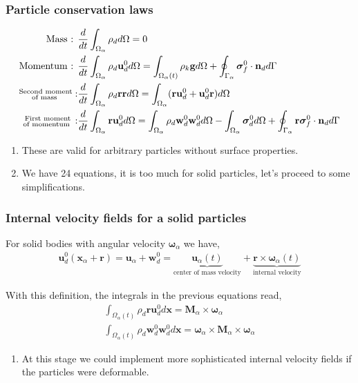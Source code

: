 \documentclass{sintefbeamer}
\begin{document}
\begin{frame}
  \frametitle{Particle conservation laws }
\begin{align*} 
  \text{Mass :   }
  &
  \frac{d}{dt} \int_{\Omega_{\alpha}} \rho_d d\Omega
  = 
  0\\
  \text{Momentum :   }
  &
  \frac{d}{dt} \int_{\Omega_{\alpha}} \rho_d \textbf{u}_d^0 d\Omega
  = 
  \int_{\Omega_\alpha(t)} \rho_k \textbf{g} d\Omega  
  + \oint_{\Gamma_{\alpha}} \bm{\sigma}_f^0 \cdot \textbf{n}_d d\Gamma
  \\
  \substack{\text{Second moment} \\ \text{of mass }} : 
  &
  \frac{d}{dt} \int_{\Omega_{\alpha}} \rho_d \textbf{rr} d\Omega
  = \int_{\Omega_{\alpha}} (\textbf{r} \textbf{u}_d^0+\textbf{u}_d^0\textbf{r} ) d\Omega\\
  \substack{\text{First moment} \\ \text{of momentum }} : 
  &
  \frac{d}{dt} \int_{\Omega_{\alpha}} \textbf{ru}_d^0 d\Omega
  = \int_{\Omega_{\alpha}}  \rho_d  \textbf{w}_d^0 \textbf{w}_d^0  d\Omega
  - \int_{\Omega_{\alpha}} \bm{\sigma}_d^0  d\Omega
  + \oint_{\Gamma_{\alpha}}  \textbf{r}\bm{\sigma}_f^0\cdot \textbf{n}_d d\Gamma
\end{align*}
  
\begin{enumerate}
  \item These are valid for arbitrary particles without surface properties. 
  \item  We have 24 equations, it is too much for solid particles, let's proceed to some simplifications. 
\end{enumerate}

\end{frame}

\begin{frame}
  \frametitle{Internal velocity fields for a solid particles}
  For solid bodies with angular velocity $\bm\omega_\alpha$ we have,
  \begin{align*}
    \textbf{u}_d^0(\textbf{x}_\alpha + \textbf{r}) = 
    \textbf{u}_\alpha + \textbf{w}_d^0  = 
    \underbrace{\textbf{u}_\alpha(t)}_\text{center of mass velocity}
    + \underbrace{\textbf{r}\times \bm\omega_\alpha(t)}_\text{internal velocity}
  \end{align*}

  With this definition, the integrals in the previous equations read,
  \begin{align*}
    \int_{\Omega_\alpha(t)} \rho_d \textbf{r} \textbf{u}_d^0 d\textbf{x}
    = 
    \textbf{M}_\alpha \times \bm\omega_\alpha
    \\
    \int_{\Omega_\alpha(t)} \rho_d \textbf{w}_d^0 \textbf{w}_d^0 d\textbf{x}
    = \bm\omega_\alpha\times \textbf{M}_\alpha\times \bm\omega_\alpha
\end{align*}

\begin{enumerate}
  \item At this stage we could implement more sophisticated internal velocity fields if the particles were deformable.  
\end{enumerate}
\end{frame}
\end{document}
